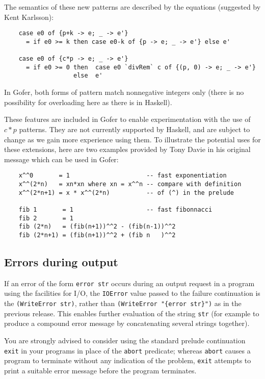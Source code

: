 The semantics of these new patterns are described by the equations
(suggested by Kent Karlsson):
\begin{verbatim}
    case e0 of {p+k -> e; _ -> e'}
      = if e0 >= k then case e0-k of {p -> e; _ -> e'} else e'

    case e0 of {c*p -> e; _ -> e'}
      = if e0 >= 0 then  case e0 `divRem` c of {(p, 0) -> e; _ -> e'}
                   else  e'
\end{verbatim}
In Gofer, both forms of pattern match nonnegative integers only (there
is no possibility for overloading here as there is in Haskell).

These features are included in Gofer to enable experimentation with the
use of $c*p$ patterns.  They are not currently supported by Haskell, and
are subject to change as we gain more experience using them.  To
illustrate the potential uses for these extensions, here are two
examples provided by Tony Davie in his original message which can be
used in Gofer:
\begin{verbatim}
    x^^0       = 1                     -- fast exponentiation 
    x^^(2*n)   = xn*xn where xn = x^^n -- compare with definition
    x^^(2*n+1) = x * x^^(2*n)          -- of (^) in the prelude

    fib 1       = 1                    -- fast fibonnacci
    fib 2       = 1
    fib (2*n)   = (fib(n+1))^^2 - (fib(n-1))^^2
    fib (2*n+1) = (fib(n+1))^^2 + (fib n   )^^2
\end{verbatim}


\subsection{Errors during output}
If an error of the form \verb"error str" occurs during an output request in
a program using the facilities for I/O, the \verb"IOError" value passed to
the failure continuation is the \verb"(WriteError str)", rather than
\verb=(WriteError "{error str}")= as in the previous release.  This enables
further evaluation of the string \verb"str" (for example to produce a
compound error message by concatenating several strings together).

You are strongly advised to consider using the standard prelude
continuation \verb"exit" in your programs in place 
of the \verb"abort" predicate;
whereas \verb"abort" causes a program to terminate without any indication of
the problem, \verb"exit" attempts to print a suitable error message before
the program terminates.


